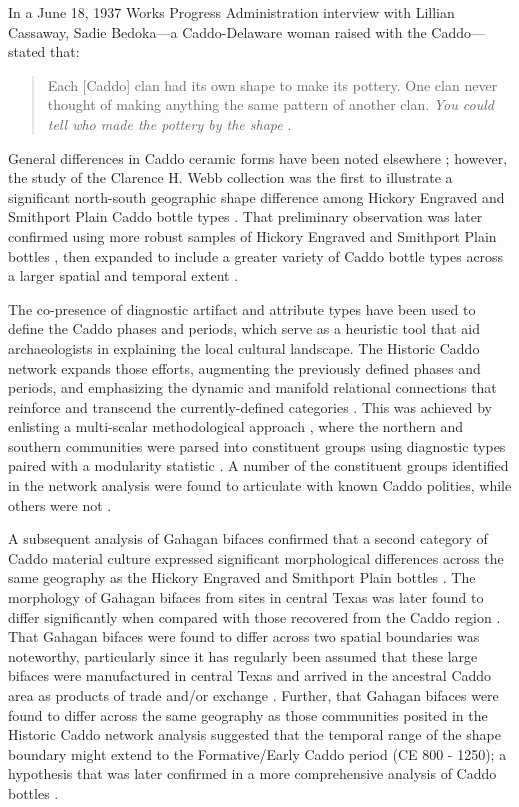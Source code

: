 \documentclass[smallextended]{svjour3}       %
\begin{document}
In a June 18, 1937 Works Progress Administration interview with Lillian
Cassaway, Sadie Bedoka---a Caddo-Delaware woman raised with the
Caddo---stated that:

\begin{quote}
Each {[}Caddo{]} clan had its own shape to make its pottery. One clan
never thought of making anything the same pattern of another clan.
\emph{You could tell who made the pottery by the shape}
\cite[395]{RN9357x}.
\end{quote}

General differences in Caddo ceramic forms have been noted elsewhere
\cite{RN5650,RN7162}; however, the study of the Clarence H. Webb
collection was the first to illustrate a significant north-south
geographic shape difference among Hickory Engraved and Smithport Plain
Caddo bottle types \cite{RN8370}. That preliminary observation was later
confirmed using more robust samples of Hickory Engraved and Smithport
Plain bottles \cite{RN8074,RN7927}, then expanded to include a greater
variety of Caddo bottle types across a larger spatial and temporal
extent \cite{RN8312}.

The co-presence of diagnostic artifact and attribute types have been
used to define the Caddo phases and periods, which serve as a heuristic
tool that aid archaeologists in explaining the local cultural landscape.
The Historic Caddo network expands those efforts, augmenting the
previously defined phases and periods, and emphasizing the dynamic and
manifold relational connections that reinforce and transcend the
currently-defined categories \cite{RN8031}. This was achieved by
enlisting a multi-scalar methodological approach \cite{RN5644,RN8039},
where the northern and southern communities were parsed into constituent
groups using diagnostic types paired with a modularity statistic
\cite{RN8051,RN8024}. A number of the constituent groups identified in
the network analysis were found to articulate with known Caddo polities,
while others were not \cite{RN8031}.

A subsequent analysis of Gahagan bifaces confirmed that a second
category of Caddo material culture expressed significant morphological
differences across the same geography as the Hickory Engraved and
Smithport Plain bottles \cite{RN8158}. The morphology of Gahagan bifaces
from sites in central Texas was later found to differ significantly when
compared with those recovered from the Caddo region \cite{RN8322}. That
Gahagan bifaces were found to differ across two spatial boundaries was
noteworthy, particularly since it has regularly been assumed that these
large bifaces were manufactured in central Texas and arrived in the
ancestral Caddo area as products of trade and/or exchange
\cite{RN8322,RN8158}. Further, that Gahagan bifaces were found to differ
across the same geography as those communities posited in the Historic
Caddo network analysis suggested that the temporal range of the shape
boundary might extend to the Formative/Early Caddo period (CE 800 -
1250); a hypothesis that was later confirmed in a more comprehensive
analysis of Caddo bottles \cite{RN8312}.
\end{document}
